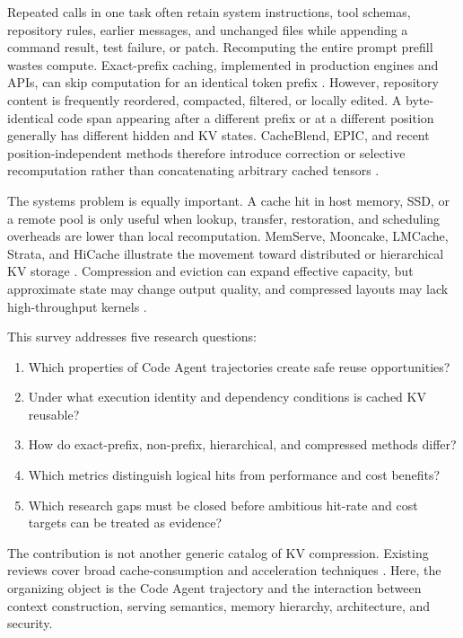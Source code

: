 \documentclass[conference,10pt]{IEEEtran}
\begin{document}
Repeated calls in one task often retain system instructions, tool schemas, repository rules, earlier messages, and unchanged files while appending a command result, test failure, or patch. Recomputing the entire prompt prefill wastes compute. Exact-prefix caching, implemented in production engines and APIs, can skip computation for an identical token prefix \cite{kwon2023efficient,zheng2023sglang,d01vllmproject,d07nvidia}. However, repository content is frequently reordered, compacted, filtered, or locally edited. A byte-identical code span appearing after a different prefix or at a different position generally has different hidden and KV states. CacheBlend, EPIC, and recent position-independent methods therefore introduce correction or selective recomputation rather than concatenating arbitrary cached tensors \cite{yao2024cacheblend,hu2024epic,ma2026irminsul}.

The systems problem is equally important. A cache hit in host memory, SSD, or a remote pool is only useful when lookup, transfer, restoration, and scheduling overheads are lower than local recomputation. MemServe, Mooncake, LMCache, Strata, and HiCache illustrate the movement toward distributed or hierarchical KV storage \cite{hu2024memserve,qin2025mooncake,liu2025lmcache,xie2025strata,d03sglangproject}. Compression and eviction can expand effective capacity, but approximate state may change output quality, and compressed layouts may lack high-throughput kernels \cite{liu2024kivi,hooper2024kvquant,gao2025rethinking}.

This survey addresses five research questions:

\begin{enumerate}
    \item Which properties of Code Agent trajectories create safe reuse opportunities?
    \item Under what execution identity and dependency conditions is cached KV reusable?
    \item How do exact-prefix, non-prefix, hierarchical, and compressed methods differ?
    \item Which metrics distinguish logical hits from performance and cost benefits?
    \item Which research gaps must be closed before ambitious hit-rate and cost targets can be treated as evidence?
\end{enumerate}

The contribution is not another generic catalog of KV compression. Existing reviews cover broad cache-consumption and acceleration techniques \cite{shi2024keep,li2024survey}. Here, the organizing object is the Code Agent trajectory and the interaction between context construction, serving semantics, memory hierarchy, architecture, and security.
\end{document}
